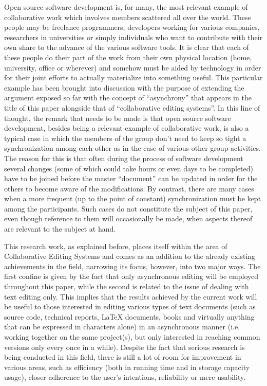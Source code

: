 Open source software development is, for many, the most relevant example of collaborative work which involves members scattered
all over the world. These people may be freelance programmers, developers working for various companies, researchers in universities
or simply individuals who want to contribute with their own share to the advance of the various software tools. It is clear that
each of these people do their part of the work from their own physical location (home, university, office or wherever) and
somehow must be aided by technology in order for their joint efforts to actually materialize into something useful.
This particular example has been brought into discussion with the purpose of extending the argument exposed so far with
the concept of ``asynchrony'' that appears in the title of this paper alongside that of ``collaborative editing systems''.
In this line of thought, the remark that needs to be made is that open source software development, besides
being a relevant example of collaborative work, is also a typical case in which the members of the group don't
need to keep so tight a synchronization among each other as in the case of various other group activities. The reason for
this is that often during the process of software development several changes (some of which could take hours or even days
to be completed) have to be joined before the master ``document'' can be updated in order for the others to become aware
of the modifications. By contrast, there are many cases when a more frequent (up to the point of constant) synchronization
must be kept among the participants. Such cases do not constitute the subject of this paper, even though reference
to them will occasionally be made, when aspects thereof are relevant to the subject at hand.

This research work, as explained before, places itself within the area of Collaborative Editing Systems and comes as an
addition to the already existing achievements in the field, narrowing its focus, however, into two major ways. The first
confine is given by the fact that only asynchronous editing will be employed throughout this paper, while the second
is related to the issue of dealing with text editing only. This implies that the results achieved by the current work
will be useful to those interested in editing various types of text documents (such as source code, technical reports,
\LaTeX{} documents, books and virtually anything that can be expressed in characters alone) in an asynchronous manner
(i.e. working together on the same project(s), but only interested in reaching common versions only every once in a while).
Despite the fact that serious research is being conducted in this field, there is still a lot of room for
improvement in various areas, such as efficiency (both in running time and in storage capacity usage), closer
adherence to the user's intentions, reliability or mere usability.


